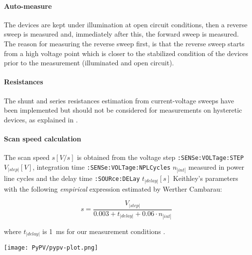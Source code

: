 		\paragraph{Auto-measure}\label{automeasure}
		The devices are kept under illumination at open circuit conditions, then a reverse sweep is measured and, immediately after this, the forward sweep is measured.
		The reason for measuring the reverse sweep first, is that the reverse sweep starts from a high voltage point which is closer to the stabilized condition of the devices prior to the measurement (illuminated and open circuit).


		\paragraph{Resistances} The shunt and series resistances estimation from current-voltage sweeps have been implemented but should not be considered for measurements on hysteretic devices, as explained in .

		\paragraph{Scan speed calculation}
		The scan speed $s[V/s]$ is obtained from the voltage step \texttt{:SENSe:VOLTage:STEP} $V_|step|[V]$, integration time \texttt{:SENSe:VOLTage:NPLCycles} $n_|int|$ measured in power line cycles and the delay time \texttt{:SOURce:DELay} $t_|delay|[s]$ Keithley's parameters with the following \textit{empirical} expression estimated by Werther Cambarau:

		\begin{equation}
			s = \frac{V_|step|}{0.003 + t_|delay| + 0.06 \cdot n_|int|}
		\end{equation}

		where $t_|delay|$ is \SI{1}{\ms} for our measurement conditions \cite{KeithleyInstruments2011}.



\begin{SCfigure}
	\centering
	\texttt{[image: PyPV/pypv-plot.png]}
	\label{fig:pypv-plot}
\end{SCfigure}


